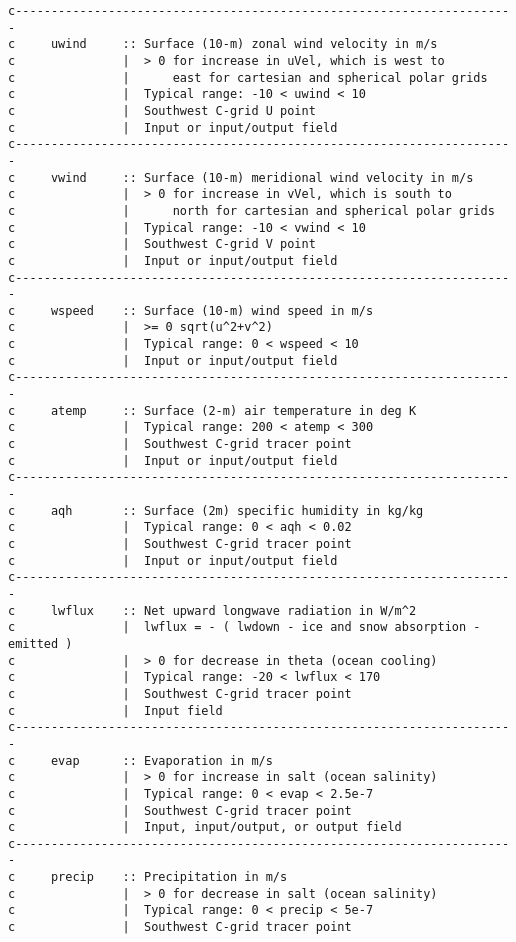 {\begin{verbatim}
c----------------------------------------------------------------------
c     uwind     :: Surface (10-m) zonal wind velocity in m/s
c               |  > 0 for increase in uVel, which is west to
c               |      east for cartesian and spherical polar grids
c               |  Typical range: -10 < uwind < 10
c               |  Southwest C-grid U point
c               |  Input or input/output field
c----------------------------------------------------------------------
c     vwind     :: Surface (10-m) meridional wind velocity in m/s
c               |  > 0 for increase in vVel, which is south to
c               |      north for cartesian and spherical polar grids
c               |  Typical range: -10 < vwind < 10
c               |  Southwest C-grid V point
c               |  Input or input/output field
c----------------------------------------------------------------------
c     wspeed    :: Surface (10-m) wind speed in m/s
c               |  >= 0 sqrt(u^2+v^2)
c               |  Typical range: 0 < wspeed < 10
c               |  Input or input/output field
c----------------------------------------------------------------------
c     atemp     :: Surface (2-m) air temperature in deg K
c               |  Typical range: 200 < atemp < 300
c               |  Southwest C-grid tracer point
c               |  Input or input/output field
c----------------------------------------------------------------------
c     aqh       :: Surface (2m) specific humidity in kg/kg
c               |  Typical range: 0 < aqh < 0.02
c               |  Southwest C-grid tracer point
c               |  Input or input/output field
c----------------------------------------------------------------------
c     lwflux    :: Net upward longwave radiation in W/m^2
c               |  lwflux = - ( lwdown - ice and snow absorption - emitted )
c               |  > 0 for decrease in theta (ocean cooling)
c               |  Typical range: -20 < lwflux < 170
c               |  Southwest C-grid tracer point
c               |  Input field
c----------------------------------------------------------------------
c     evap      :: Evaporation in m/s
c               |  > 0 for increase in salt (ocean salinity)
c               |  Typical range: 0 < evap < 2.5e-7
c               |  Southwest C-grid tracer point
c               |  Input, input/output, or output field
c----------------------------------------------------------------------
c     precip    :: Precipitation in m/s
c               |  > 0 for decrease in salt (ocean salinity)
c               |  Typical range: 0 < precip < 5e-7
c               |  Southwest C-grid tracer point

\end{verbatim}}
